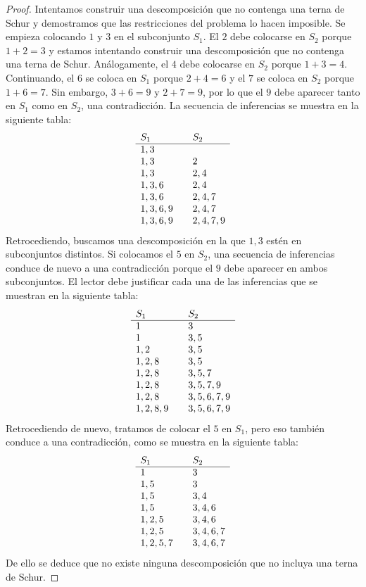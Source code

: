 \begin{proof}
Intentamos construir una descomposición que no contenga una terna de Schur y demostramos que las restricciones del problema lo hacen imposible. Se empieza colocando $1$ y $3$ en el subconjunto $S_1$. El $2$ debe colocarse en $S_2$ porque $1+2=3$ y estamos intentando construir una descomposición que no contenga una terna de Schur. Análogamente, el $4$ debe colocarse en $S_2$ porque $1+3=4$. Continuando, el $6$ se coloca en $S_1$ porque $2+4=6$ y el $7$ se coloca en $S_2$ porque $1+6=7$. Sin embargo, $3+6=9$ y $2+7=9$, por lo que el $9$ debe aparecer tanto en $S_1$ como en $S_2$, una contradicción. La secuencia de inferencias se muestra en la siguiente tabla:
\[
\begin{array}{l@{\hspace{2em}}l}
S_1&S_2\\\hline
1,3 & \\
1,3 & 2\\
1,3 & 2,4\\
1,3,6 & 2,4\\
1,3,6 & 2,4,7\\
1,3,6,9 & 2,4,7\\
1,3,6,9 & 2,4,7,9
\end{array}
\]
Retrocediendo, buscamos una descomposición en la que $1,3$ estén en subconjuntos distintos. Si colocamos el $5$ en $S_2$, una secuencia de inferencias conduce de nuevo a una contradicción porque el $9$ debe aparecer en ambos subconjuntos. El lector debe justificar cada una de las inferencias que se muestran en la siguiente tabla:
\[
\begin{array}{l@{\hspace{2em}}l}
S_1&S_2\\\hline
1&3\\
1 & 3,5\\
1,2&3,5\\
1,2,8&3,5\\
1,2,8&3,5,7\\
1,2,8&3,5,7,9\\
1,2,8&3,5,6,7,9\\
1,2,8,9&3,5,6,7,9
\end{array}
\]
Retrocediendo de nuevo, tratamos de colocar el $5$ en $S_1$, pero eso también conduce a una contradicción, como se muestra en la siguiente tabla:
\[
\begin{array}{l@{\hspace{2em}}l}
S_1&S_2\\\hline
1&3\\
1,5& 3\\
1,5&3,4\\
1,5&3,4,6\\
1,2,5&3,4,6\\
1,2,5&3,4,6,7\\
1,2,5,7&3,4,6,7
\end{array}
\]
De ello se deduce que no existe ninguna descomposición que no incluya una terna de Schur.
\end{proof}

